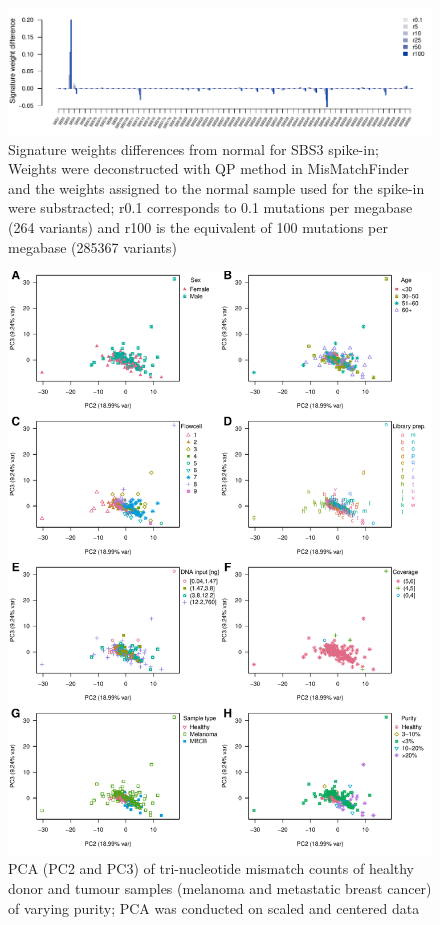 \begin{figure}[ht]
\centering
\includegraphics[width=.99\linewidth]{Figures/MisMatchFinder/SBS3SpikeInSignatureDifferences.pdf}
\caption[Signature weights differences from normal for SBS3 spike-in]{Signature weights differences from normal for SBS3 spike-in; Weights were deconstructed with QP method in MisMatchFinder and the weights assigned to the normal sample used for the spike-in were substracted; r0.1 corresponds to 0.1 mutations per megabase (264 variants) and r100 is the equivalent of 100 mutations per megabase (285367 variants)}\label{A:fig:sbs3spikeindifferences}
\end{figure}

\begin{figure}[ht]
\centering
\includegraphics[width=.99\linewidth]{Figures/MisMatchFinder/countPCAsPC2vsPC3.pdf}
\caption[PCA of tri-nucleotide mismatch counts of real world data (PC2 and PC3)]{PCA (PC2 and PC3) of tri-nucleotide mismatch counts of healthy donor and tumour samples (melanoma and metastatic breast cancer) of varying purity; PCA was conducted on scaled and centered data}\label{A:fig:mmf-pca2v3}
\end{figure}

